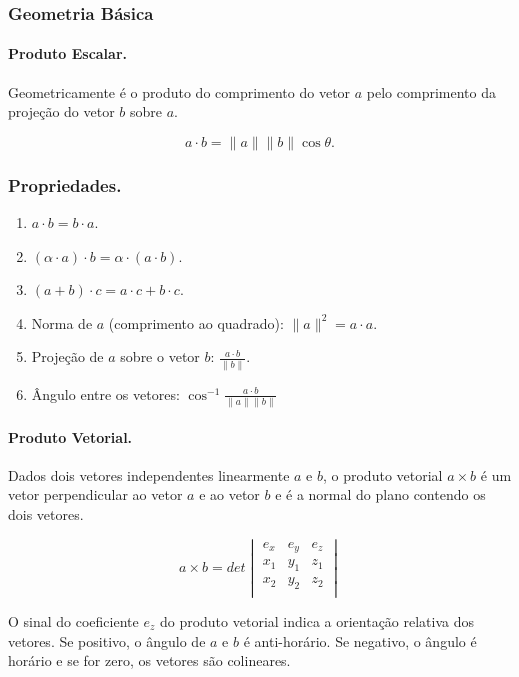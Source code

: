 \subsubsection{Geometria Básica}
\paragraph{Produto Escalar.}
Geometricamente é o produto do comprimento do vetor $a$ pelo comprimento da projeção do vetor $b$ sobre $a$.

$$a \cdot b = \|a\|\|b\|\cos\theta.$$

\subsubsection*{Propriedades.}
\begin{multicols}{2}
	\begin{enumerate}
		\item $a \cdot b = b \cdot a$.
		\item $(\alpha \cdot a) \cdot b = \alpha\cdot(a \cdot b)$.
		\item $(a+b)\cdot c = a\cdot c + b \cdot c$.
		\item Norma de $a$ (comprimento ao quadrado): $\|a\|^2 = a \cdot a$.
		\item Projeção de $a$ sobre o vetor $b$: $\frac{a \cdot b}{\|b\|}$.
		\item Ângulo entre os vetores: $\cos^{-1}{\frac{a \cdot b}{\|a\|\|b\|}}$
	\end{enumerate}
\end{multicols}

\paragraph{Produto Vetorial.}
Dados dois vetores independentes linearmente $a$ e $b$, o produto vetorial $a \times b$ é um vetor perpendicular ao vetor $a$ e ao vetor $b$ e é a normal do plano contendo os dois vetores.

$$a \times b = det
	\begin{vmatrix}
		e_x & e_y & e_z \\
		x_1 & y_1 & z_1 \\
		x_2 & y_2 & z_2 \\
	\end{vmatrix}
$$

O sinal do coeficiente $e_z$ do produto vetorial indica a orientação relativa dos vetores. Se positivo, o ângulo de $a$ e $b$ é anti-horário. Se negativo, o ângulo é horário e se for zero, os vetores são colineares.


